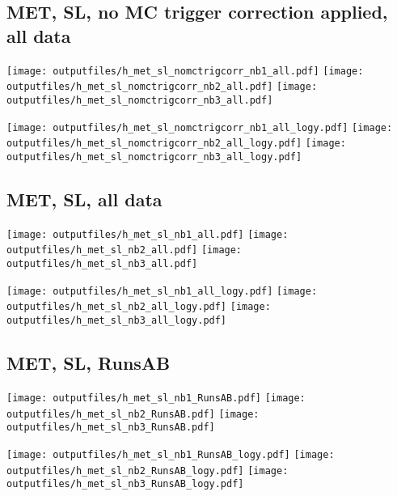 \documentclass[11pt]{article}
\begin{document}
     \subsection{ MET, SL, no MC trigger correction applied, all data}

    \noindent
     \texttt{[image: outputfiles/h\_met\_sl\_nomctrigcorr\_nb1\_all.pdf]}
     \texttt{[image: outputfiles/h\_met\_sl\_nomctrigcorr\_nb2\_all.pdf]}
     \texttt{[image: outputfiles/h\_met\_sl\_nomctrigcorr\_nb3\_all.pdf]}

    \noindent
     \texttt{[image: outputfiles/h\_met\_sl\_nomctrigcorr\_nb1\_all\_logy.pdf]}
     \texttt{[image: outputfiles/h\_met\_sl\_nomctrigcorr\_nb2\_all\_logy.pdf]}
     \texttt{[image: outputfiles/h\_met\_sl\_nomctrigcorr\_nb3\_all\_logy.pdf]}


     \subsection{ MET, SL, all data}

    \noindent
     \texttt{[image: outputfiles/h\_met\_sl\_nb1\_all.pdf]}
     \texttt{[image: outputfiles/h\_met\_sl\_nb2\_all.pdf]}
     \texttt{[image: outputfiles/h\_met\_sl\_nb3\_all.pdf]}

    \noindent
     \texttt{[image: outputfiles/h\_met\_sl\_nb1\_all\_logy.pdf]}
     \texttt{[image: outputfiles/h\_met\_sl\_nb2\_all\_logy.pdf]}
     \texttt{[image: outputfiles/h\_met\_sl\_nb3\_all\_logy.pdf]}


     \subsection{ MET, SL, RunsAB}

    \noindent
     \texttt{[image: outputfiles/h\_met\_sl\_nb1\_RunsAB.pdf]}
     \texttt{[image: outputfiles/h\_met\_sl\_nb2\_RunsAB.pdf]}
     \texttt{[image: outputfiles/h\_met\_sl\_nb3\_RunsAB.pdf]}

    \noindent
     \texttt{[image: outputfiles/h\_met\_sl\_nb1\_RunsAB\_logy.pdf]}
     \texttt{[image: outputfiles/h\_met\_sl\_nb2\_RunsAB\_logy.pdf]}
     \texttt{[image: outputfiles/h\_met\_sl\_nb3\_RunsAB\_logy.pdf]}
\end{document}
